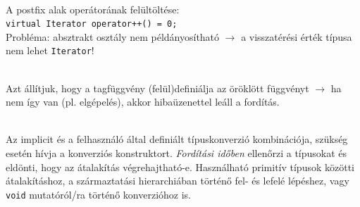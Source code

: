 \begin{frame}
    \begin{exampleblock}{}
        
    \end{exampleblock}
\end{frame}

\begin{frame}
    \begin{description}[m]
        \item[\texttt{operator++}] \hfill \\ A postfix alak operátorának felültöltése:\\ \texttt{virtual Iterator operator++() = 0;} \\
            Probléma: absztrakt osztály nem példányosítható $\to$ a visszatérési érték típusa nem lehet \texttt{Iterator}! 
    \end{description}
\end{frame}

\begin{frame}
    \begin{exampleblock}{}
        
    \end{exampleblock}
\end{frame}

\begin{frame}
    \begin{exampleblock}{}
        \small
        
    \end{exampleblock}
\end{frame}

\begin{frame}
    \begin{description}[m]
        \item[\hiv{\href{https://en.cppreference.com/w/cpp/language/override}{\texttt{override}}}] \hfill \\ Azt állítjuk, hogy a tagfüggvény (felül)definiálja az öröklött függvényt $\to$ ha nem így van (pl. elgépelés), akkor hibaüzenettel leáll a fordítás.
        \item[\hiv{\href{https://en.cppreference.com/w/cpp/language/static_cast}{\texttt{static\_cast}}}] \hfill \\ Az implicit és a felhasználó által definiált típuskonverzió kombinációja, szükség esetén hívja a konverziós konstruktort. \emph{Fordítási időben} ellenőrzi a típusokat és eldönti, hogy az átalakítás végrehajtható-e. Használható primitív típusok közötti átalakításhoz, a származtatási hierarchiában történő fel- és lefelé lépéshez, vagy \texttt{void} mutatóról/ra történő konverzióhoz is.
    \end{description}
\end{frame}


